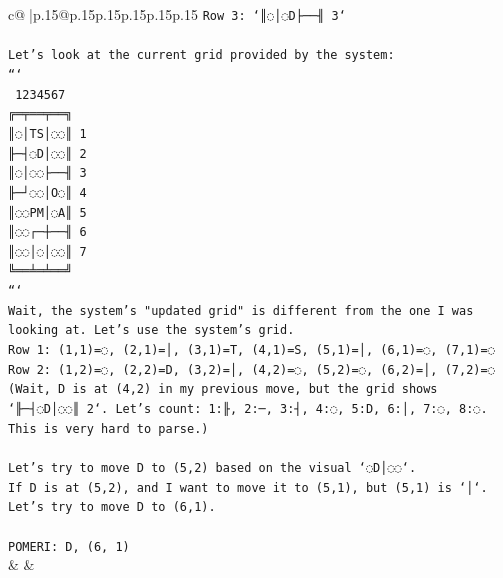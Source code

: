 \documentclass{article}
\begin{document}
{\begin{supertabular}{c@{$\;$}|p{.15\linewidth}@{}p{.15\linewidth}p{.15\linewidth}p{.15\linewidth}p{.15\linewidth}p{.15\linewidth}}
{{{\texttt{Row 3: `║◌│◌D├──╢ 3`} \\
\\ 
\texttt{Let's look at the current grid provided by the system:} \\
\texttt{```} \\
\texttt{ 1234567} \\
\texttt{╔═╤══╤══╗} \\
\texttt{║◌│TS│◌◌║ 1} \\
\texttt{╟─┤◌D│◌◌║ 2} \\
\texttt{║◌│◌◌├──╢ 3} \\
\texttt{╟─┘◌◌│O◌║ 4} \\
\texttt{║◌◌PM│◌A║ 5} \\
\texttt{║◌◌┌─┼──╢ 6} \\
\texttt{║◌◌│◌│◌◌║ 7} \\
\texttt{╚══╧═╧══╝} \\
\texttt{```} \\
\texttt{Wait, the system's "updated grid" is different from the one I was looking at. Let's use the system's grid.} \\
\texttt{Row 1: (1,1)=◌, (2,1)=│, (3,1)=T, (4,1)=S, (5,1)=│, (6,1)=◌, (7,1)=◌} \\
\texttt{Row 2: (1,2)=◌, (2,2)=D, (3,2)=│, (4,2)=◌, (5,2)=◌, (6,2)=│, (7,2)=◌ (Wait, D is at (4,2) in my previous move, but the grid shows `╟─┤◌D│◌◌║ 2`. Let's count: 1:╟, 2:─, 3:┤, 4:◌, 5:D, 6:│, 7:◌, 8:◌. This is very hard to parse.)} \\
\\ 
\texttt{Let's try to move D to (5,2) based on the visual `◌D│◌◌`.} \\
\texttt{If D is at (5,2), and I want to move it to (5,1), but (5,1) is `│`.} \\
\texttt{Let's try to move D to (6,1).} \\
\\ 
\texttt{POMERI: D, (6, 1)} \\
            }
        }
    }
    & & \\ \\


\end{supertabular}}
\end{document}
